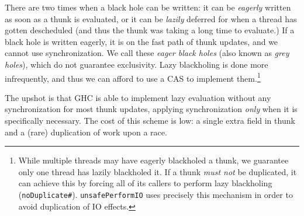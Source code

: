 There are two times when a black hole can be written: it can be \emph{eagerly}
written as soon as a thunk is evaluated, or it can be \emph{lazily} deferred
for when a thread has gotten descheduled (and thus the thunk was taking
a long time to evaluate.)  If a black hole is written eagerly,
it is on the fast path of thunk updates, and we cannot use
synchronization.  We call these \emph{eager black holes} (also known as
\emph{grey holes}), which do not guarantee exclusivity.  Lazy blackholing is done more infrequently, and thus
we can afford to use a CAS to implement them.\footnote{While multiple
    threads may have eagerly blackholed a thunk, we guarantee only one
    thread has lazily blackholed it.  If a thunk \emph{must not} be
duplicated, it can achieve this by forcing all of its callers to perform
lazy blackholing
(\texttt{noDuplicate\#}).  \texttt{unsafePerformIO} uses precisely
this mechanism in order to avoid duplication of IO effects.}

The upshot is that GHC is able to implement lazy evaluation without any
synchronization for most thunk updates, applying synchronization
\emph{only} when it is specifically necessary. The cost of this scheme
is low: a single extra field in thunk and a (rare) duplication of work
upon a race.
